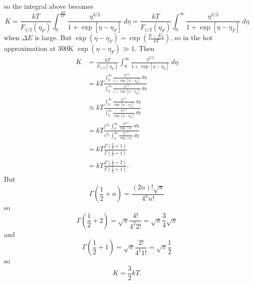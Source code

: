\documentclass{article}
\begin{document}
so the integral above becomes
$$
K = \frac{kT}{F_{1/2}(\eta_F)}
   \int_{0}^{\frac{\Delta E}{kT}}
   \frac{\eta^{3/2}}{1 + \exp[\eta - \eta_F]}~d\eta
 = \frac{kT}{F_{1/2}(\eta_F)}
   \int_{0}^{\infty}
   \frac{\eta^{3/2}}{1 + \exp[\eta - \eta_F]}~d\eta
$$
when $\Delta E$ is large. But 
$\exp(\eta - \eta_F) = \exp\left(\frac{E - E_F}{kT}\right)$,
so in the hot approximation at 300K $\exp(\eta - \eta_F) \gg 1$.
Then 
\begin{align*}
K &= \frac{kT}{F_{1/2}(\eta_F)}
     \int_{0}^{\infty}
     \frac{\eta^{3/2}}{1 + \exp[\eta - \eta_F]}~d\eta  \\
  &= kT \frac{\int_{0}^{\infty}
     \frac{\eta^{3/2}}{1 + \exp[\eta - \eta_F]}~d\eta}
          {\int_{0}^{\infty}
            \frac{\eta^{1/2}}{1 + \exp[\eta - \eta_F]}~d\eta}  \\
  &\approx kT \frac{\int_{0}^{\infty}
     \frac{\eta^{3/2}}{\exp[\eta - \eta_F]}~d\eta}
          {\int_{0}^{\infty}
            \frac{\eta^{1/2}}{\exp[\eta - \eta_F]}~d\eta}  \\
  &= kT \frac{e^{\eta_F}\int_{0}^{\infty}
     \frac{\eta^{3/2}}{\exp[\eta]}~d\eta}
          {e^{\eta_F}\int_{0}^{\infty}
            \frac{\eta^{1/2}}{\exp[\eta]}~d\eta}  \\
  &= kT \frac{\Gamma\left(\frac{3}{2} + 1\right)}
             {\Gamma\left(\frac{1}{2} + 1\right)} \\
  &= kT \frac{\Gamma\left(\frac{1}{2} + 2\right)}
             {\Gamma\left(\frac{1}{2} + 1\right)}.
\end{align*}
But
$$
\Gamma\left(\frac{1}{2} + n\right) = \frac{(2n)!\sqrt{\pi}}{4^n n!}
$$
so
$$
\Gamma\left(\frac{1}{2} + 2\right) = \sqrt{\pi} \frac{4!}{4^2 2!} 
                                   = \sqrt{\pi} \frac{3}{4} \sqrt{\pi}
$$
and
$$
\Gamma\left(\frac{1}{2} + 1\right) = \sqrt{\pi} \frac{2!}{4^1 1!}
                                   = \sqrt{\pi} \frac{1}{2}
$$
so
$$
K = \frac{3}{2} kT.
$$
\end{document}

